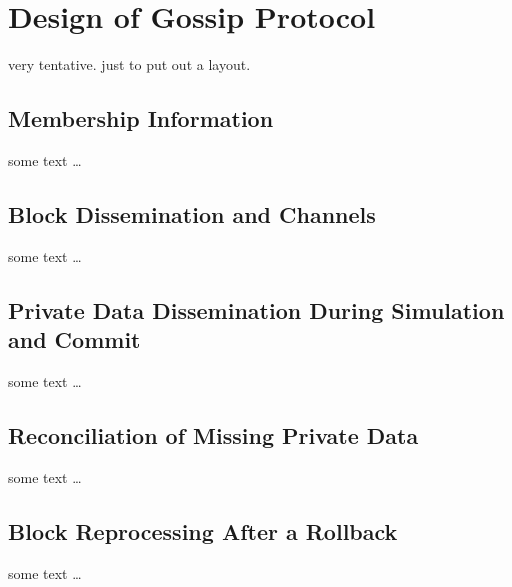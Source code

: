 \section{Design of Gossip Protocol}
very tentative. just to put out a layout.

\subsection{Membership Information}
some text \ldots

\subsection{Block Dissemination and Channels}
some text \ldots

\subsection{Private Data Dissemination During Simulation and Commit}
some text \ldots

\subsection{Reconciliation of Missing Private Data}
some text \ldots

\subsection{Block Reprocessing After a Rollback}
some text \ldots
